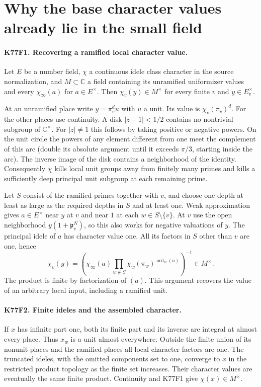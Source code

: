 \section{Why the base character values already lie in the small field}

\paragraph{K77F1. Recovering a ramified local character value.}
Let $E$ be a number field, $\chi$ a continuous idele class character
in the source normalization, and $M\subset\mathbb C$ a field
containing its unramified uniformizer values and every
$\chi_\infty(a)$ for $a\in E^\times$. Then
$\chi_v(y)\in M^\times$ for every finite $v$ and $y\in E_v^\times$.

At an unramified place write $y=\pi_v^d u$ with $u$ a unit.
Its value is $\chi_v(\pi_v)^d$. For the other places use continuity.
A disk $|z-1|<1/2$ contains no nontrivial subgroup of
$\mathbb C^\times$. For $|z|\ne1$ this follows by taking positive
or negative powers. On the unit circle the powers of any element
different from one meet the complement of this arc (double its
absolute argument until it exceeds $\pi/3$, starting inside the
arc). The inverse image of the disk contains a neighborhood of
the identity. Consequently $\chi$ kills local unit groups away
from finitely many primes and kills a sufficiently deep principal
unit subgroup at each remaining prime.

Let $S$ consist of the ramified primes together with $v$, and choose
one depth at least as large as the required depths in $S$ and at
least one. Weak approximation gives $a\in E^\times$ near $y$ at
$v$ and near $1$ at each $w\in S\setminus\{v\}$. At $v$ use the
open neighborhood $y(1+\mathfrak p_v^N)$, so this also works for
negative valuations of $y$. The principal idele of $a$ has character
value one. All its factors in $S$ other than $v$ are one, hence
\[
 \chi_v(y)=\left(\chi_\infty(a)
       \prod_{w\notin S}\chi_w(\pi_w)^{\operatorname{ord}_w(a)}
                    \right)^{-1}\in M^\times.
\]
The product is finite by factorization of $(a)$. This argument
recovers the value of an arbitrary local input, including a ramified
unit.

\paragraph{K77F2. Finite ideles and the assembled character.}
If $x$ has infinite part one, both its finite part and its inverse
are integral at almost every place. Thus $x_w$ is a unit almost
everywhere. Outside the finite union of its nonunit places and the
ramified places all local character factors are one. The truncated
ideles, with the omitted components set to one, converge to $x$ in
the restricted product topology as the finite set increases.
Their character values are eventually the same finite product.
Continuity and K77F1 give $\chi(x)\in M^\times$.

